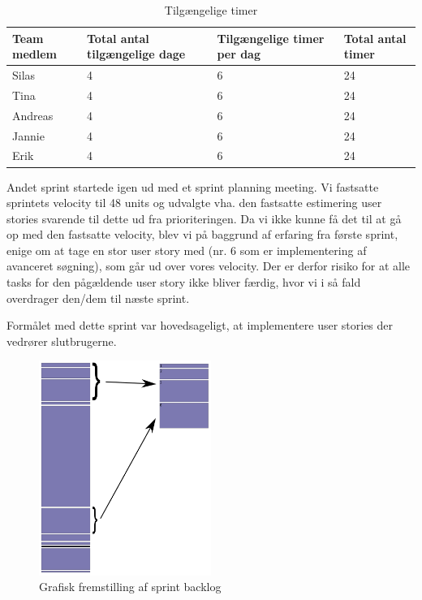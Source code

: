 \documentclass[12pt, a4paper]{report}
\begin{document}
\begin{table}[ht]
\caption{Tilgængelige timer}
\label{sprint2timer}
\begin{tabular}{| p{3cm} | p{4cm} | p{4cm} | p{4cm} |}
\hline
Team medlem & Total antal tilgængelige dage & Tilgængelige timer per dag & Total antal timer \\ \hline
Silas & 4 & 6 & 24 \\ \hline
Tina & 4 & 6 & 24 \\ \hline
Andreas & 4 & 6 & 24 \\ \hline
Jannie & 4 & 6 & 24 \\ \hline
Erik & 4 & 6 & 24 \\
\hline
\end{tabular}
\end{table}

Andet sprint startede igen ud med et sprint planning meeting. Vi fastsatte sprintets velocity til 48 units og udvalgte vha. den fastsatte estimering user stories svarende til dette ud fra prioriteringen. Da vi ikke kunne få det til at gå op med den fastsatte velocity, blev vi på baggrund af erfaring fra første sprint, enige om at tage en stor user story med (nr. 6 som er implementering af avanceret søgning), som går ud over vores velocity. Der er derfor risiko for at alle tasks for den pågældende user story ikke bliver færdig, hvor vi i så fald overdrager den/dem til næste sprint.

Formålet med dette sprint var hovedsageligt, at implementere user stories der vedrører slutbrugerne.

\begin{figure}[hb]
\includegraphics[width=0.5\textwidth]{sprint2log}
\caption{Grafisk fremstilling af sprint backlog}
\label{sprintlog2}
\end{figure}
\end{document}
